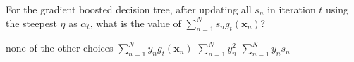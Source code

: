 \documentclass[a4paper,10pt]{exam}
\begin{document}
\begin{questions}
		\question For the gradient boosted decision tree, after updating all $s_n$ in iteration $t$ using the steepest $\eta$ as $\alpha_t$, what is the value of $\sum_{n=1}^N s_n g_t(\mathbf{x}_n)$?
		
		\begin{choices}
			\choice none of the other choices
			\CorrectChoice $\sum_{n=1}^N y_n g_t(\mathbf{x}_n)$
			\choice $\sum_{n=1}^N y_n^2$
			\choice $\sum_{n=1}^N y_n s_n$
			
	    \end{choices}
	\end{questions}
\end{document}
